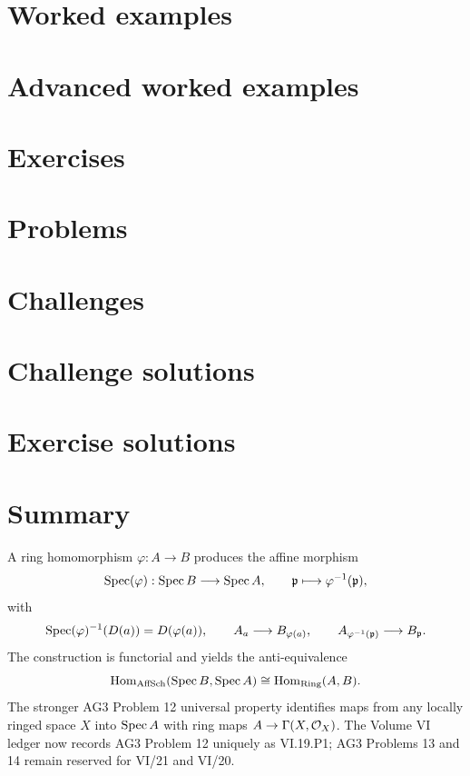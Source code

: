 \section{Worked examples}


\section{Advanced worked examples}


\section{Exercises}

\ifdefined\IncludeExerciseHints

\fi

\section{Problems}


\section{Challenges}


\ifdefined\IncludeChallengeSolutions
\section{Challenge solutions}

\fi

\ifdefined\IncludeExerciseSolutions
\section{Exercise solutions}

\fi

\section*{Summary}

A ring homomorphism $\varphi:A\to B$ produces the affine morphism
\[
\operatorname{Spec}(\varphi):\operatorname{Spec} B\longrightarrow\operatorname{Spec} A,
\qquad
\mathfrak p\longmapsto\varphi^{-1}(\mathfrak p),
\]
with
\[
\operatorname{Spec}(\varphi)^{-1}(D(a))=D(\varphi(a)),
\qquad
A_a\longrightarrow B_{\varphi(a)},
\qquad
A_{\varphi^{-1}(\mathfrak p)}\longrightarrow B_{\mathfrak p}.
\]
The construction is functorial and yields the anti-equivalence
\[
\operatorname{Hom}_{\mathrm{AffSch}}(\operatorname{Spec} B,\operatorname{Spec} A)
\cong\operatorname{Hom}_{\mathrm{Ring}}(A,B).
\]
The stronger AG3 Problem 12 universal property identifies maps from any locally ringed
space $X$ into $\operatorname{Spec} A$ with ring maps $A\to\Gamma(X,\mathcal O_X)$.  The Volume VI ledger now
records AG3 Problem 12 uniquely as VI.19.P1; AG3 Problems 13 and 14 remain reserved for
VI/21 and VI/20.
